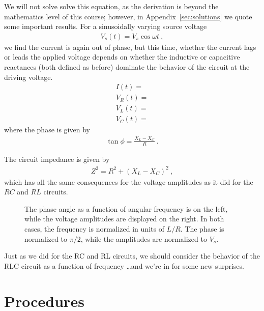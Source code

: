 \documentclass[12pt]{article}
\begin{document}
We will not solve solve this equation, as the derivation is beyond the
mathematics level of this course; however, in
Appendix~\ref{sec:solutions} we quote some important results.  For a
sinusoidally varying source voltage
\begin{gather*}
  V_s(t) = V_s \cos\omega t\ ,
\end{gather*}
we find the current is again out of phase, but this time, whether the
current lags or leads the applied voltage depends on whether the
inductive or capacitive reactances (both defined as before) dominate
the behavior of the circuit at the driving voltage.  
\begin{gather*}
  I(t) = \\
  V_R(t) = \\
  V_L(t) = \\
  V_C(t) = 
\end{gather*}
where the phase is given by 
\begin{gather*}
  \tan \phi = \frac{X_L - X_C}{R}\ .
\end{gather*}

The circuit impedance is given by
\begin{gather*}
  Z^2 = R^2 + \left(X_L-X_C\right)^2\ ,
\end{gather*}
which has all the same consequences for the voltage amplitudes as it
did for the $RC$ and $RL$ circuits.

\begin{figure}
  \centering
  \subfloat[][Phases]{
  }
  \caption{The phase angle as a function of angular frequency is on
    the left, while the voltage amplitudes are displayed on the
    right.  In both cases, the frequency is normalized in units of
    $L/R$.  The phase is normalized to $\pi/2$, while the amplitudes
    are normalized to $V_s$.}
  \label{fig:frequency}
\end{figure}
Just as we did for the RC and RL circuits, we should consider the behavior of
the RLC circuit as a function of frequency \ldots and we're in for
some new surprises.  

\section{Procedures}
\label{sec:procedures}
\end{document}
